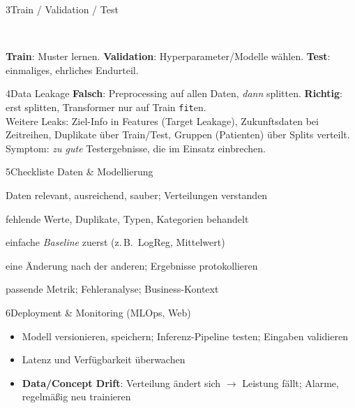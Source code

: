 \begin{hngrid}
\begin{hnp}[raster multicolumn=3,acc=hnpurple]{3}{Train / Validation / Test}
\centering
{}\\[2pt]
\raggedright\textbf{Train}: Muster lernen. \textbf{Validation}: Hyperparameter/Modelle wählen. \textbf{Test}: einmaliges, ehrliches Endurteil. 
\end{hnp}
%
\begin{hnp}[raster multicolumn=3,acc=hnred]{4}{Data Leakage}
\textbf{Falsch}: Preprocessing auf allen Daten, \emph{dann} splitten. \textbf{Richtig}: erst splitten, Transformer nur auf Train \texttt{fit}en.\\
Weitere Leaks: Ziel-Info in Features (Target Leakage), Zukunftsdaten bei Zeitreihen, Duplikate über Train/Test, Gruppen (Patienten) über Splits verteilt.\\
Symptom: \emph{zu gute} Testergebnisse, die im Einsatz einbrechen.
\end{hnp}
%
\begin{hnp}[raster multicolumn=3,acc=hngreen]{5}{Checkliste Daten \& Modellierung}
\begin{hnchk}
\item Daten relevant, ausreichend, sauber; Verteilungen verstanden
\item fehlende Werte, Duplikate, Typen, Kategorien behandelt
\item einfache \emph{Baseline} zuerst (z.\,B.\ LogReg, Mittelwert)
\item eine Änderung nach der anderen; Ergebnisse protokollieren
\item passende Metrik; Fehleranalyse; Business-Kontext
\end{hnchk}
\end{hnp}
%
\begin{hnp}[raster multicolumn=3,acc=hnteal]{6}{Deployment \& Monitoring (MLOps, Web)}
\begin{itemize}
\item Modell versionieren, speichern; Inferenz-Pipeline testen; Eingaben validieren
\item Latenz und Verfügbarkeit überwachen
\item \textbf{Data/Concept Drift}: Verteilung ändert sich $\to$ Leistung fällt; Alarme, regelmäßig neu trainieren

\end{itemize}
\end{hnp}
\end{hngrid}

